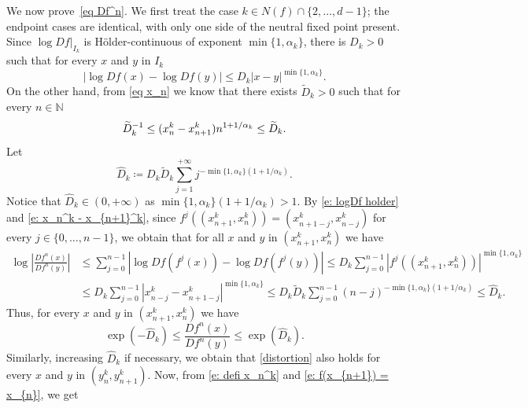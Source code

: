\documentclass[10pt,a4paper]{amsart}
\numberwithin{equation}{section} %
\numberwithin{figure}{section} %
\newcommand{\N}{\mathbb{N}}
\renewcommand{\=}{\coloneqq}
\begin{document}
    We now prove~\eqref{eq Df^n}. We first treat the case $k\in N(f)\cap\{2,\ldots,d-1\}$; the endpoint cases are identical, with only one side of the neutral fixed point present. Since $\log Df|_{I_k}$ is Hölder-continuous of exponent $\min\{1,\alpha_k\}$, there is $D_k >0$ such that for every $x$ and $y$ in $I_k$ 
    \begin{equation}\label{e: logDf holder}
        |\log Df(x) - \log Df(y)|\leq D_k |x-y|^{\min\{1,\alpha_k\}}.
    \end{equation}
    On the other hand, from \eqref{eq x_n} we know that there exists $\widetilde{D}_k>0$ such that for every $n\in \N$
    \begin{equation}\label{e: x_n^k - x_{n+1}^k}
        \widetilde{D}_k^{-1}\leq (x_n^k-x_{n+1}^k) n^{1+1/\alpha_k}\leq \widetilde{D}_k. 
    \end{equation}
    Let 
    \begin{equation*}
        \widehat{D}_k\= D_k\widetilde{D}_k \sum_{j=1}^{+\infty} j^{-\min\{1,\alpha_k\}(1+1/\alpha_k)}.
    \end{equation*}
    Notice that $\widehat{D}_k\in(0,+\infty)$ as $\min\{1,\alpha_k\}(1+1/\alpha_k)>1$. By \eqref{e: logDf holder} and \eqref{e: x_n^k - x_{n+1}^k}, since $f^j((x_{n+1}^k,x_n^k))=(x_{n+1-j}^k,x_{n-j}^k)$ for every $j\in \{0,\ldots,n-1\}$, we obtain that for all $x$ and $y$ in $(x_{n+1}^k,x_n^k)$ we have
    \begin{equation*}
    \begin{split}
        \log\left|\frac{Df^n(x)}{Df^n(y)}\right| &\leq \sum_{j=0}^{n-1}|\log Df(f^j(x))-\log Df(f^{j}(y))| \leq D_k \sum_{j=0}^{n-1}|f^j((x_{n+1}^k,x_n^k))|^{\min\{1,\alpha_k\}}\\
        &\leq  D_k\sum_{j=0}^{n-1} |x_{n-j}^k-x_{n+1-j}^k|^{\min\{1,\alpha_k\}} \leq D_k\widetilde{D}_k \sum_{j=0}^{n-1} (n-j)^{-\min\{1,\alpha_k\}(1+1/\alpha_k)} \leq \widehat{D}_k.
        \end{split}
    \end{equation*}
    Thus, for every $x$ and $y$ in $(x_{n+1}^k,x_n^k)$ we have 
    \begin{equation}\label{distortion}
      \exp(-\widehat{D}_k) \leq \frac{Df^n(x)}{Df^n(y)}\leq \exp(\widehat{D}_k).
    \end{equation}
    Similarly, increasing $\widehat{D}_k$ if necessary, we obtain that \eqref{distortion} also holds for every $x$ and $y$ in $(y_n^k,y_{n+1}^k)$. Now, from \eqref{e: defi x_n^k} and \eqref{e: f(x_{n+1}) = x_{n}}, we get 
\end{document}

